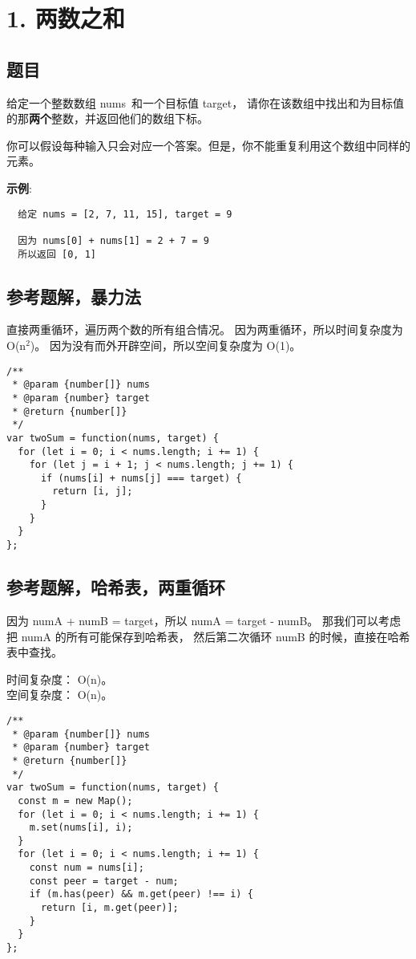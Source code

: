 \newpage
\section{1. 两数之和}
\label{leetcode:1}

\subsection{题目}

给定一个整数数组 nums 和一个目标值 target，
请你在该数组中找出和为目标值的那\textbf{两个}整数，并返回他们的数组下标。

你可以假设每种输入只会对应一个答案。但是，你不能重复利用这个数组中同样的元素。

\textbf{示例}:

\begin{verbatim}
  给定 nums = [2, 7, 11, 15], target = 9

  因为 nums[0] + nums[1] = 2 + 7 = 9
  所以返回 [0, 1]
\end{verbatim}

\subsection{参考题解，暴力法}

直接两重循环，遍历两个数的所有组合情况。
因为两重循环，所以时间复杂度为 O(n$^{2}$)。
因为没有而外开辟空间，所以空间复杂度为 O(1)。

\begin{verbatim}
/**
 * @param {number[]} nums
 * @param {number} target
 * @return {number[]}
 */
var twoSum = function(nums, target) {
  for (let i = 0; i < nums.length; i += 1) {
    for (let j = i + 1; j < nums.length; j += 1) {
      if (nums[i] + nums[j] === target) {
        return [i, j];
      }
    }
  }
};
\end{verbatim}

\subsection{参考题解，哈希表，两重循环}

因为 numA + numB = target，所以 numA = target - numB。
那我们可以考虑把 numA 的所有可能保存到哈希表，
然后第二次循环 numB 的时候，直接在哈希表中查找。

时间复杂度： O(n)。\\
空间复杂度： O(n)。

\begin{verbatim}
/**
 * @param {number[]} nums
 * @param {number} target
 * @return {number[]}
 */
var twoSum = function(nums, target) {
  const m = new Map();
  for (let i = 0; i < nums.length; i += 1) {
    m.set(nums[i], i);
  }
  for (let i = 0; i < nums.length; i += 1) {
    const num = nums[i];
    const peer = target - num;
    if (m.has(peer) && m.get(peer) !== i) {
      return [i, m.get(peer)];
    }
  }
};
\end{verbatim}

